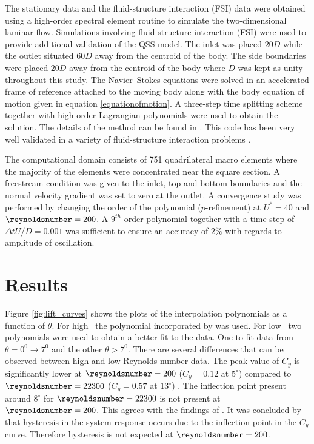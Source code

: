  The stationary data and the fluid-structure interaction (FSI) data were obtained using a high-order spectral element routine to simulate the two-dimensional laminar flow.  Simulations involving fluid structure interaction (FSI) were used to provide additional validation of the QSS model. The inlet was placed $20D$ while the outlet situated $60D$ away from the centroid of the body. The side boundaries were placed $20D$ away from the centroid of the body where $D$ was kept as unity throughout this study. The Navier--Stokes equations were solved in an accelerated frame of reference attached to the moving body along with the body equation of motion given in equation \ref{equationofmotion}. A three-step time splitting scheme together with high-order Lagrangian polynomials were used to obtain the solution. The details of the method can be found in \citet{Thompson2006,Thompson1996a}. This code has been very well validated in a variety of fluid-structure interaction problems \citep{Leontini2007a,Griffith2011,Leontini2011,Leontini2013}.
  
 The computational domain consists of 751 quadrilateral macro elements where the majority of the elements were concentrated near the square section. A freestream condition was given to the inlet, top and bottom boundaries and the normal velocity gradient was set to zero at the outlet. A convergence study was performed by changing the order of the polynomial ($p$-refinement) at $U^*=40$ and $\reynoldsnumber=200$. A $9^{th}$ order polynomial together with a time step of $\Delta tU/D=0.001$ was sufficient to ensure an accuracy of $2\%$ with regards to amplitude of oscillation.
 
 
 
 
 \section{Results}
  \label{sec:results}
  
     Figure \ref{fig:lift_curves} shows the plots of the interpolation polynomials as a function of $\theta$. For high \reynoldsnumber \ the polynomial incorporated by \cite{Parkinson1964} was used. For low \reynoldsnumber \ two polynomials were used to obtain a better fit to the data. One to fit data from $\theta=0^0 \rightarrow 7^0$ and the other $\theta > 7^0$. 
   There are several differences that can be observed between high and low Reynolds number data. The peak value of $C_y$ is  significantly lower at $\reynoldsnumber=200$ ($C_y=0.12$ at $5^\circ$) compared to $\reynoldsnumber=22300$ ($C_y=0.57$ at $13^\circ$) . The inflection point present around $8^\circ$ for $\reynoldsnumber=22300$ is not present at $\reynoldsnumber=200$. This agrees with the findings of \cite{Luo2003}.  It was concluded by \cite{Luo2003} that hysteresis in the system response occurs due to the inflection point in the $C_y$ curve. Therefore hysteresis is not expected at $\reynoldsnumber=200$.
  
